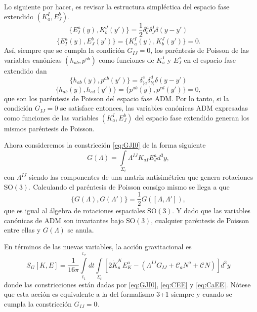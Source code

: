 Lo siguiente por hacer, es revisar la estructura simpl\'{e}ctica del espacio fase extendido $(K^{I}_{a}, E^{b}_{J})$.
%
\begin{equation}
\{E^{a}_{I}(y), K^{J}_{b}(y')\} = \frac{1}{2} \delta^{a}_{b} \delta^{I}_{J} \delta(y-y')
\end{equation}
%
\begin{equation}
\{E^{a}_{I}(y), E^{b}_{J}(y')\} = \{K^{I}_{a}(y), K^{J}_{b}(y')\} = 0.
\end{equation}
%
As\'{i}, siempre que se cumpla la condici\'{o}n $G_{IJ} = 0$, los par\'{e}ntesis de Poisson de las variables can\'{o}nicas $(h_{ab}, p^{ab})$ como funciones de $K^{I}_{a}$ y $E^{a}_{J}$ en el espacio fase extendido dan
%
\begin{equation}
\{h_{ab}(y), p^{ab}(y')\} = \delta^{c}_{(a} \delta^{d}_{b)} \delta(y-y')
\end{equation}
%
\begin{equation}
\{h_{ab}(y), h_{cd}(y')\} = \{p^{ab}(y), p^{cd}(y')\} = 0,
\end{equation}
%
que son los par\'{e}ntesis de Poisson del espacio fase ADM. Por lo tanto, si la condici\'{o}n $G_{IJ} = 0$ se satisface entonces, las variables can\'{o}nicas ADM expresadas como funciones de las variables $(K^{I}_{a}, E^{b}_{J})$ del espacio fase extendido generan los mismos par\'{e}ntesis de Poisson.

Ahora consideremos la constricci\'{o}n \eqref{eq:GJI0} de la forma siguiente
%
\begin{equation}
G(\Lambda) = \int\limits_{\Sigma_{t}} \Lambda^{IJ} K_{aI} E^{a}_{J} d^{3}y,
\end{equation}
%
con $\Lambda^{IJ}$ siendo las componentes de una matriz antisim\'{e}trica que genera rotaciones $\mathrm{SO}(3)$. Calculando el par\'{e}ntesis de Poisson consigo mismo se llega a que
%
\begin{equation}
\{G(\Lambda), G(\Lambda')\} = \frac{1}{2} G([\Lambda, \Lambda']),
\end{equation}
%
que es igual al \'{a}lgebra de rotaciones espaciales $\mathrm{SO}(3)$. Y dado que las variables can\'{o}nicas de ADM son invariantes bajo $\mathrm{SO}(3)$, cualquier par\'{e}ntesis de Poisson entre ellas y $G(\Lambda)$ se anula.

En t\'{e}rminos de las nuevas variables, la acci\'{o}n gravitacional es
%
\begin{equation}
S_{G}[K,E] = \frac{1}{16 \pi} \int\limits^{t_{2}}_{t_{1}} dt \int\limits_{\Sigma_{t}} \left[2 \dot{K}^{K}_{a} E^{a}_{K} - (\Lambda^{IJ} G_{IJ} + \mathcal{C}_{a} N^{a} + \mathcal{C} N) \right] d^{3}y
\end{equation}
%
donde las constricciones est\'{a}n dadas por \eqref{eq:GJI0}, \eqref{eq:CEE} y \eqref{eq:CaEE}. N\'{o}tese que esta acci\'{o}n es equivalente a la del formalismo 3+1 siempre y cuando se cumpla la constricci\'{o}n $G_{IJ} = 0$.
